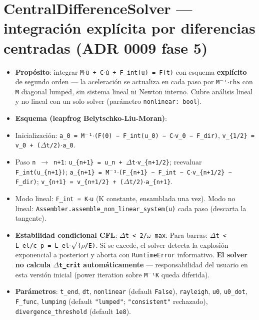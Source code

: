 \documentclass[11pt,letterpaper,oneside]{report}
\begin{document}
\section{CentralDifferenceSolver --- integración explícita por diferencias centradas (ADR 0009 fase 5)}

\begin{itemize}
  \item \textbf{Propósito}: integrar \texttt{M\ensuremath{\cdot}ü + C\ensuremath{\cdot}u̇ + F\_int(u) = F(t)} con esquema \textbf{explícito} de segundo orden --- la aceleración se actualiza en cada paso por \texttt{M\ensuremath{^{-}}¹\ensuremath{\cdot}rhs} con \texttt{M} diagonal lumped, sin sistema lineal ni Newton interno. Cubre análisis lineal y no lineal con un solo solver (parámetro \texttt{nonlinear: bool}).
  \item \textbf{Esquema (leapfrog Belytschko-Liu-Moran)}:
  \item Inicialización: \texttt{a\_0 = M\ensuremath{^{-}}¹\ensuremath{\cdot}(F(0) − F\_int(u\_0) − C\ensuremath{\cdot}v\_0 − F\_dir)}, \texttt{v\_\{1/2\} = v\_0 + (\ensuremath{\Delta}t/2)\ensuremath{\cdot}a\_0}.
  \item Paso \texttt{n \ensuremath{\to} n+1}: \texttt{u\_\{n+1\} = u\_n + \ensuremath{\Delta}t\ensuremath{\cdot}v\_\{n+1/2\}}; reevaluar \texttt{F\_int(u\_\{n+1\})}; \texttt{a\_\{n+1\} = M\ensuremath{^{-}}¹\ensuremath{\cdot}(F\_\{n+1\} − F\_int − C\ensuremath{\cdot}v\_\{n+1/2\} − F\_dir)}; \texttt{v\_\{n+1\} = v\_\{n+1/2\} + (\ensuremath{\Delta}t/2)\ensuremath{\cdot}a\_\{n+1\}}.
  \item Modo lineal: \texttt{F\_int = K\ensuremath{\cdot}u} (K constante, ensamblada una vez). Modo no lineal: \texttt{Assembler.assemble\_non\_linear\_system(u)} cada paso (descarta la tangente).
  \item \textbf{Estabilidad condicional CFL}: \texttt{\ensuremath{\Delta}t < 2/\ensuremath{\omega}\_max}. Para barras: \texttt{\ensuremath{\Delta}t < L\_el/c\_p = L\_el\ensuremath{\cdot}\ensuremath{\surd}(\ensuremath{\rho}/E)}. Si se excede, el solver detecta la explosión exponencial a posteriori y aborta con \texttt{RuntimeError} informativo. \textbf{El solver no calcula \texttt{\ensuremath{\Delta}t\_crit} automáticamente} --- responsabilidad del usuario en esta versión inicial (power iteration sobre \texttt{M\ensuremath{^{-}}¹K} queda diferida).
  \item \textbf{Parámetros}: \texttt{t\_end}, \texttt{dt}, \texttt{nonlinear} (default \texttt{False}), \texttt{rayleigh}, \texttt{u0}, \texttt{u0\_dot}, \texttt{F\_func}, \texttt{lumping} (default \texttt{"lumped"}; \texttt{"consistent"} rechazado), \texttt{divergence\_threshold} (default \texttt{1e8}).

\end{itemize}
\end{document}
